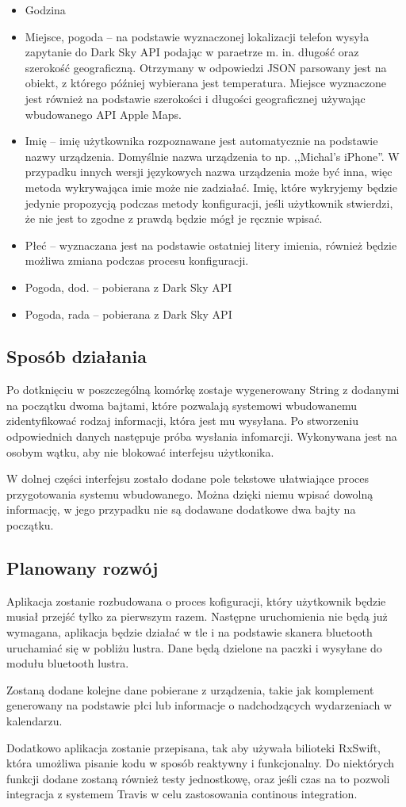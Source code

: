 \documentclass[a4paper,11pt]{article}
\begin{document}
\begin{itemize}
\item Godzina
\item Miejsce, pogoda -- na podstawie wyznaczonej lokalizacji telefon wysyła zapytanie do Dark Sky API podając w paraetrze m. in. długość oraz szerokość geograficzną. Otrzymany w odpowiedzi JSON parsowany jest na obiekt, z którego później wybierana jest temperatura. Miejsce wyznaczone jest również na podstawie szerokości i długości geograficznej używając wbudowanego  API Apple Maps.
\item Imię -- imię użytkownika rozpoznawane jest automatycznie na podstawie nazwy urządzenia. Domyślnie nazwa urządzenia to np. ,,Michal's iPhone''. W przypadku innych wersji językowych nazwa urządzenia może być inna, więc metoda wykrywająca imie może nie zadziałać. Imię, które wykryjemy będzie jedynie propozycją podczas metody konfiguracji, jeśli użytkownik stwierdzi, że nie jest to zgodne z prawdą będzie mógł je ręcznie wpisać.
\item Płeć -- wyznaczana jest na podstawie ostatniej litery imienia, również będzie możliwa zmiana podczas procesu konfiguracji.
\item Pogoda, dod. -- pobierana z Dark Sky API
\item Pogoda, rada -- pobierana z Dark Sky API
\end{itemize}

\subsection{Sposób działania}
Po dotknięciu w poszczególną komórkę zostaje wygenerowany String z dodanymi na początku dwoma bajtami, które pozwalają systemowi wbudowanemu zidentyfikować rodzaj informacji, która jest mu wysyłana. Po stworzeniu odpowiednich danych następuje próba wysłania infomarcji. Wykonywana jest na osobym wątku, aby nie blokować interfejsu użytkonika.

W dolnej części interfejsu zostało dodane pole tekstowe ułatwiające proces przygotowania systemu wbudowanego. Można dzięki niemu wpisać dowolną informację, w jego przypadku nie są dodawane dodatkowe dwa bajty na początku.

\subsection{Planowany rozwój}

Aplikacja zostanie rozbudowana o proces kofiguracji, który użytkownik będzie musiał przejść tylko za pierwszym razem. Następne uruchomienia nie będą już wymagana, aplikacja będzie działać w tle i na podstawie skanera bluetooth uruchamiać się w pobliżu lustra. Dane będą dzielone na paczki i wysyłane do modułu bluetooth lustra.

Zostaną dodane kolejne dane pobierane z urządzenia, takie jak komplement generowany na podstawie płci lub informacje o nadchodzących wydarzeniach w kalendarzu.

Dodatkowo aplikacja zostanie przepisana, tak aby używała bilioteki RxSwift, która umożliwa pisanie kodu w sposób reaktywny i funkcjonalny. Do niektórych funkcji dodane zostaną również testy jednostkowę, oraz jeśli czas na to pozwoli integracja z systemem Travis w celu zastosowania continous integration.
	
\end{document}

